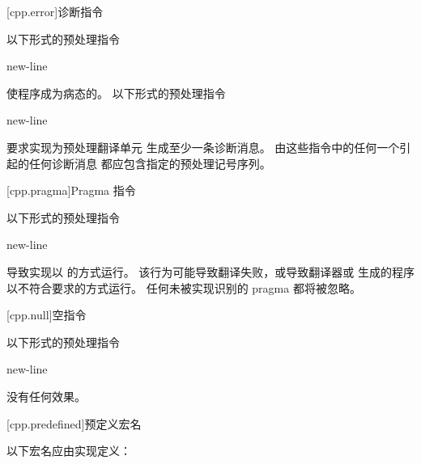     [cpp.error]{诊断指令}%
    
    \pnum
    以下形式的预处理指令
    \begin{ncsimplebnf}
      new-line
    \end{ncsimplebnf}
    使程序成为病态的。
    以下形式的预处理指令
    \begin{ncsimplebnf}
      new-line
    \end{ncsimplebnf}
    要求实现为预处理翻译单元 生成至少一条诊断消息。
    \recommended
    由这些指令中的任何一个引起的任何诊断消息
    都应包含指定的预处理记号序列。
    
    [cpp.pragma]{Pragma 指令}%
    
    \pnum
    以下形式的预处理指令
    \begin{ncsimplebnf}
      new-line
    \end{ncsimplebnf}
    导致实现以
     的方式运行。
    该行为可能导致翻译失败，或导致翻译器或
    生成的程序以不符合要求的方式运行。
    任何未被实现识别的 pragma 都将被忽略。
    
    [cpp.null]{空指令}%
    
    \pnum
    以下形式的预处理指令
    \begin{ncsimplebnf}
    \terminal{\#} new-line
    \end{ncsimplebnf}
    没有任何效果。
    
    [cpp.predefined]{预定义宏名}
    
    \pnum
    以下宏名应由实现定义：
    
